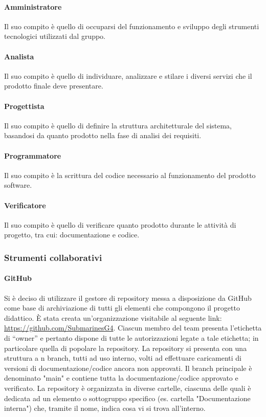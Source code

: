 \paragraph{Amministratore}
Il suo compito è quello di occuparsi del funzionamento e sviluppo degli strumenti tecnologici utilizzati dal gruppo.

\paragraph{Analista}
Il suo compito è quello di individuare, analizzare e stilare i diversi servizi che il prodotto finale deve presentare.

\paragraph{Progettista}
Il suo compito è quello di definire la struttura architetturale del sistema, basandosi da quanto prodotto nella fase di analisi dei requisiti.

\paragraph{Programmatore}
Il suo compito è la scrittura del codice necessario al funzionamento del prodotto software.

\paragraph{Verificatore}
Il suo compito è quello di verificare quanto prodotto durante le attività di progetto, tra cui: documentazione e codice.

\subsubsection{Strumenti collaborativi}
\paragraph{GitHub}
Si è deciso di utilizzare il gestore di repository\glo{} messa a disposizione da GitHub\glo{} come base di
archiviazione di tutti gli elementi che compongono il progetto didattico. È stata creata un’organizzazione visitabile al seguente link: \href{https://github.com/SubmarinesG4}{https://github.com/SubmarinesG4}.
Ciascun membro del team presenta l’etichetta di “owner” e pertanto dispone di tutte le autorizzazioni legate a tale etichetta; in particolare quella di popolare la repository.
La repository si presenta con una struttura a n branch, tutti ad uso interno, volti ad effettuare caricamenti di versioni di documentazione/codice ancora non approvati. Il branch principale è denominato "main" e contiene tutta la documentazione/codice approvato e verificato. 
La repository è organizzata in diverse cartelle, ciascuna delle quali è dedicata ad un elemento o sottogruppo specifico (es. cartella "Documentazione interna") che, tramite il nome, indica cosa vi si trova all'interno. 

